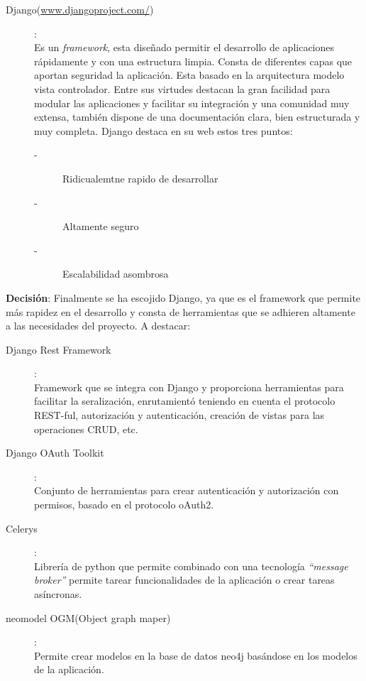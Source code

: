 \documentclass[12pt]{article} %
\begin{document}
\begin{description}
\item[Django(\url{www.djangoproject.com/})]:
\\Es un \textit{framework}, esta diseñado permitir el desarrollo de aplicaciones rápidamente y con una estructura limpia. Consta de diferentes capas que aportan seguridad la aplicación. Esta basado en la arquitectura modelo vista controlador. Entre sus virtudes destacan la gran facilidad para modular las aplicaciones y facilitar su integración y una comunidad muy extensa, también dispone de una documentación clara, bien estructurada y muy completa. Django destaca en su web estos tres puntos:

\begin{description}
\item[-]Ridicualemtne rapido de desarrollar
\item[-]Altamente seguro
\item[-]Escalabilidad asombrosa
\end{description}
\end{description}

\textbf{Decisión}:
Finalmente se ha escojido Django, ya que es el framework que permite más rapidez en el desarrollo y consta de herramientas que se adhieren altamente a las necesidades del proyecto. A destacar:
\begin{description}
\item[Django Rest Framework]:\\Framework que se integra con Django y proporciona herramientas para facilitar la seralización, enrutamientó teniendo en cuenta el protocolo REST-ful, autorización y autenticación, creación de vistas para las operaciones CRUD, etc.
\item[Django OAuth Toolkit]:\\Conjunto de herramientas para crear autenticación y autorización con permisos, basado en el protocolo oAuth2.
\item[Celerys]:\\Librería de python que permite combinado con una tecnología \textit{``message broker''} permite tarear funcionalidades de la aplicación o crear tareas asíncronas.
\item[neomodel OGM(Object graph maper)]:\\Permite crear modelos en la base de datos neo4j basándose en los modelos de la aplicación.
\end{description}

\end{document}
